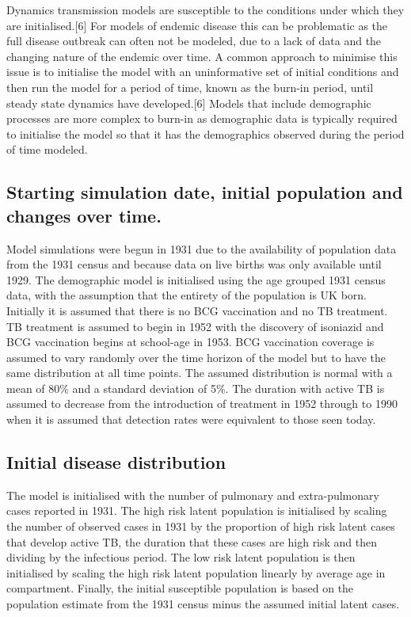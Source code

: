 \documentclass[11pt,twoside]{bristolthesis}
\begin{document}
  Dynamics transmission models are susceptible to the conditions under which they are initialised.{[}6{]} For models of endemic disease this can be problematic as the full disease outbreak can often not be modeled, due to a lack of data and the changing nature of the endemic over time. A common approach to minimise this issue is to initialise the model with an uninformative set of initial conditions and then run the model for a period of time, known as the burn-in period, until steady state dynamics have developed.{[}6{]} Models that include demographic processes are more complex to burn-in as demographic data is typically required to initialise the model so that it has the demographics observed during the period of time modeled.
  
  \hypertarget{starting-simulation-date-initial-population-and-changes-over-time.}{%
  \subsection{Starting simulation date, initial population and changes over time.}\label{starting-simulation-date-initial-population-and-changes-over-time.}}
  
  Model simulations were begun in 1931 due to the availability of population data from the 1931 census and because data on live births was only available until 1929. The demographic model is initialised using the age grouped 1931 census data, with the assumption that the entirety of the population is UK born. Initially it is assumed that there is no BCG vaccination and no TB treatment. TB treatment is assumed to begin in 1952 with the discovery of isoniazid and BCG vaccination begins at school-age in 1953. BCG vaccination coverage is assumed to vary randomly over the time horizon of the model but to have the same distribution at all time points. The assumed distribution is normal with a mean of 80\% and a standard deviation of 5\%. The duration with active TB is assumed to decrease from the introduction of treatment in 1952 through to 1990 when it is assumed that detection rates were equivalent to those seen today.
  
  \hypertarget{initial-disease-distribution}{%
  \subsection{Initial disease distribution}\label{initial-disease-distribution}}
  
  The model is initialised with the number of pulmonary and extra-pulmonary cases reported in 1931. The high risk latent population is initialised by scaling the number of observed cases in 1931 by the proportion of high risk latent cases that develop active TB, the duration that these cases are high risk and then dividing by the infectious period. The low risk latent population is then initialised by scaling the high risk latent population linearly by average age in compartment. Finally, the initial susceptible population is based on the population estimate from the 1931 census minus the assumed initial latent cases.
  
\end{document}

